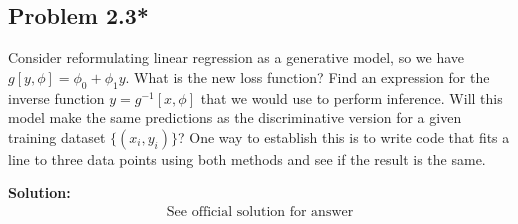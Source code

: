 \documentclass{article}
\begin{document}
    \subsection*{Problem 2.3*}
    Consider reformulating linear regression as a generative model, so we have $g[y, \phi] = \phi_0 + \phi_1 y$. What is the new loss function? Find an expression for the inverse function $y = g^{-1}[x, \phi]$ that we would use to perform inference. Will this model make the same predictions as the discriminative version for a given training dataset $\{(x_i, y_i)\}$? One way to establish this is to write code that fits a line to three data points using both methods and see if the result is the same.

        \vspace{1cm}
        \textbf{Solution:}
        \begin{align*}
            \text{See official solution for answer}
        \end{align*}
\end{document}
